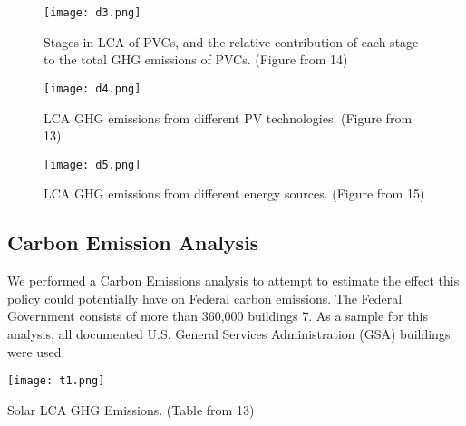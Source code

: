 \begin{figure}
\begin{center}
\texttt{[image: d3.png]}
\caption{Stages in LCA of PVCs, and the relative contribution of each stage to the total GHG emissions of PVCs. (Figure from \cite{deb}{14})}
\label{d3}
\end{center}
\end{figure}

\begin{figure}
\begin{center}
\texttt{[image: d4.png]}
\caption{LCA GHG emissions from different PV technologies. (Figure from \cite{deb}{13})}
\label{d4}
\end{center}
\end{figure}

\begin{figure}
\begin{center}
\texttt{[image: d5.png]}
\caption{LCA GHG emissions from different energy sources. (Figure from \cite{deb}{15})}
\label{d5}
\end{center}
\end{figure}

\subsection{Carbon Emission Analysis}
We performed a Carbon Emissions analysis to attempt to estimate the effect this policy could potentially have on Federal carbon emissions. The Federal Government consists of more than 360,000 buildings \cite{deb}{7}. As a sample for this analysis, all documented U.S. General Services Administration (GSA) buildings were used.

\begin{table}
\begin{center}
\texttt{[image: t1.png]}
\caption{Solar LCA GHG Emissions. (Table from \cite{deb}{13})}
\label{t1}
\end{center}
\end{table}

